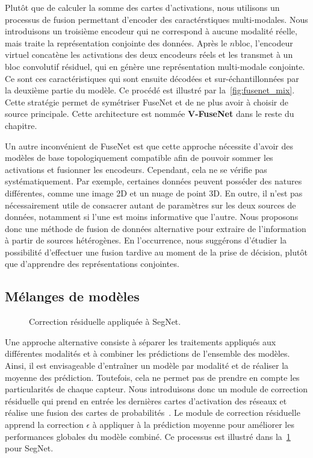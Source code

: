 Plutôt que de calculer la somme des cartes d'activations, nous utilisons un processus de fusion permettant d'encoder des caractérstiques multi-modales. Nous introduisons un troisième encodeur qui ne correspond à aucune modalité réelle, mais traite la représentation conjointe des données. Après le $n$\ieme bloc, l'encodeur virtuel concatène les activations des deux encodeurs réels et les transmet à un bloc convolutif résiduel, qui en génère une représentation multi-modale conjointe. Ce sont ces caractéristiques qui sont ensuite décodées et sur-échantillonnées par la deuxième partie du modèle. Ce procédé est illustré par la~\cref{fig:fusenet_mix}. Cette stratégie permet de symétriser FuseNet et de ne plus avoir à choisir de source principale. Cette architecture est nommée \textbf{V-FuseNet} dans le reste du chapitre.

Un autre inconvénient de FuseNet est que cette approche nécessite d'avoir des modèles de base topologiquement compatible afin de pouvoir sommer les activations et fusionner les encodeurs. Cependant, cela ne se vérifie pas systématiquement. Par exemple, certaines données peuvent posséder des natures différentes, comme une image 2D et un nuage de point 3D. En outre, il n'est pas nécessairement utile de consacrer autant de paramètres sur les deux sources de données, notamment si l'une est moins informative que l'autre. Nous proposons donc une méthode de fusion de données alternative pour extraire de l'information à partir de sources hétérogènes. En l'occurrence, nous suggérons d'étudier la possibilité d'effectuer une fusion tardive au moment de la prise de décision, plutôt que d'apprendre des représentations conjointes.

\subsection{Mélanges de modèles}

\begin{figure}[h]
    \resizebox{\textwidth}{!}{}
    \caption{Correction résiduelle appliquée à SegNet.}
    \label{fig:residual_correction}
\end{figure}

Une approche alternative consiste à séparer les traitements appliqués aux différentes modalités et à combiner les prédictions de l'ensemble des modèles. Ainsi, il est envisageable d'entraîner un modèle par modalité et de réaliser la moyenne des prédiction. Toutefois, cela ne permet pas de prendre en compte les particularités de chaque capteur. Nous introduisons donc un module de correction résiduelle qui prend en entrée les dernières cartes d'activation des réseaux et réalise une fusion des cartes de probabilités~\cite{audebert_semantic_2016}. Le module de correction résiduelle apprend la correction $\epsilon$ à appliquer à la prédiction moyenne pour améliorer les performances globales du modèle combiné. Ce processus est illustré dans la~\cref{fig:residual_correction} pour SegNet.

